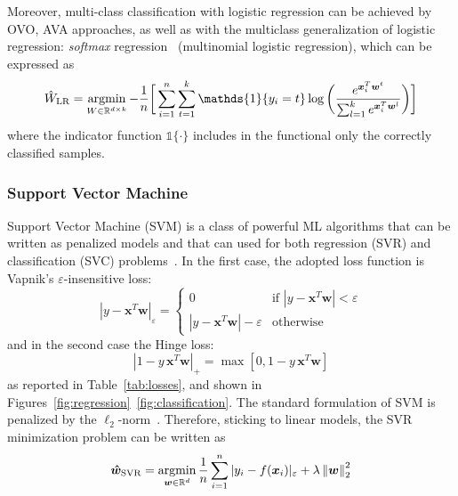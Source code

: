 			Moreover, multi-class classification with logistic regression can be achieved by OVO, AVA approaches, as well as with the multiclass generalization of logistic regression: \textit{softmax} regression~\cite{hastie2009elements} (\aka multinomial logistic regression), which can be expressed as
			\begin{equation} \label{eq:softmax}
				\hat W_{\text{LR}} = \argmin_{W \in \mathbb{R}^{d \times k}} -\frac{1}{n} \bigg[ \sum_{i=1}^n \sum_{t=1}^k \mathds{1}\{y_i = t\} \log \bigg(\frac{e^{\bm{x}_i^T\bm{w}^t}}{\sum_{l=1}^k e^{\bm{x}_i^T \bm{w}^l}} \bigg) \bigg]
			\end{equation}
			where the indicator function $\mathds{1}\{\cdot\}$ includes in the functional only the correctly classified samples.

			\subsubsection{Support Vector Machine} \label{sec:svm}
			Support Vector Machine (\ac{SVM}) is a class of powerful ML algorithms that can be written as penalized models and that can used for both regression (\ac{SVR}) and classification (\ac{SVC}) problems~\cite{evgeniou2000regularization}. In the first case, the adopted loss function is Vapnik's $\varepsilon$-insensitive loss:
			\begin{equation} \label{eq:epsilon_insensitive}
				|y - \bm{x}^T\bm{w}|_\varepsilon =
   			\begin{cases}
					0 & \text{if } |y-\bm{x}^T\bm{w}| < \varepsilon\\
					|y-\bm{x}^T\bm{w}| - \varepsilon & \text{otherwise}
				\end{cases}
			\end{equation}
			and in the second case the Hinge loss:
			\begin{equation} \label{eq:hinge_loss}
				|1 - y\,\bm{x}^T\bm{w}|_+ = \max[0, 1 - y\,\bm{x}^T\bm{w}]
			\end{equation}
			as reported in Table~\ref{tab:losses}, and shown in Figures~\ref{fig:regression}~\ref{fig:classification}. The standard formulation of SVM is penalized by the $\ell_2$-norm~\cite{vapnik2013nature}.
			Therefore, sticking to linear models, the SVR minimization problem can be written as
			\begin{equation} \label{eq:svr}
				\bm{\hat w}_{\text{SVR}} = \mathop{\mathrm{argmin}}\limits_{\bm{w} \in \mathbb{R}^d} \frac{1}{n} \sum_{i=1}^n |y_i - f(\bm{x}_i)|_\varepsilon + \lambda \left\lVert\bm{w}\right\rVert_2^2
			\end{equation}
